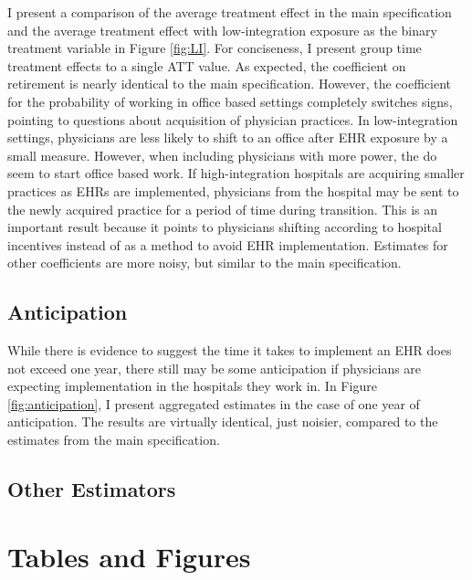 \documentclass[11pt]{article}
\begin{document}
I present a comparison of the average treatment effect in the main specification and the average treatment effect with low-integration exposure as the binary treatment variable in Figure \ref{fig:LI}. For conciseness, I present group time treatment effects to a single ATT value. As expected, the coefficient on retirement is nearly identical to the main specification. However, the coefficient for the probability of working in office based settings completely switches signs, pointing to questions about acquisition of physician practices. In low-integration settings, physicians are less likely to shift to an office after EHR exposure by a small measure. However, when including physicians with more power, the do seem to start office based work. If high-integration hospitals are acquiring smaller practices as EHRs are implemented, physicians from the hospital may be sent to the newly acquired practice for a period of time during transition. This is an important result because it points to physicians shifting according to hospital incentives instead of as a method to avoid EHR implementation. Estimates for other coefficients are more noisy, but similar to the main specification. 



\subsection{Anticipation}\label{app:anticipation}

While there is evidence to suggest the time it takes to implement an EHR does not exceed one year, there still may be some anticipation if physicians are expecting implementation in the hospitals they work in. In Figure \ref{fig:anticipation}, I present aggregated estimates in the case of one year of anticipation. The results are virtually identical, just noisier, compared to the estimates from the main specification. 

\subsection{Other Estimators}


\clearpage

\section{Tables and Figures}
\end{document}
